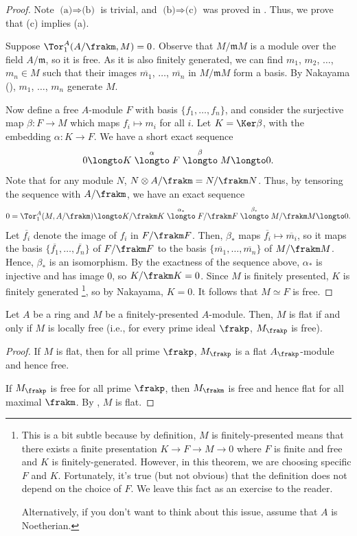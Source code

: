 \begin{proof}
    Note $\text{(a)}\Rightarrow\text{(b)}$ is trivial, and $\text{(b)}\Rightarrow\text{(c)}$ was proved in .
    Thus, we prove that (c) implies (a).

    Suppose $\Tor_1^A(A/\frakm, M)=0$. Observe that $M/\mathfrak mM$ is a module over the field $A/\mathfrak m$, so it is free. As it is also finitely generated, we can find $m_1$, $m_2$, $\dots$, $m_n\in M$ such that their images $\overline{m_1}$, $\dots$, $\overline{m_n}$ in $M/\mathfrak mM$ form a basis. By Nakayama (), 
    $m_1$, $\dots$, $m_n$ generate $M$.

    Now define a free $A$-module $F$ with basis $\{f_1, \dots, f_n\}$, and consider the surjective map $\beta: F\to M$ which maps $f_i\mapsto m_i$ for all $i$. Let $K=\Ker \beta$, with the embedding $\alpha:K\to F$. We have a short exact sequence \[0\longto K\stackrel\alpha\longto F\stackrel\beta\longto M\longto 0.\] Note that for any module $N$, $N\otimes A/\frakm = N/\frakm N$. Thus, by tensoring the sequence with $A/\frakm$, we have an exact sequence 
    \[0 = \Tor_1^A(M, A/\frakm) \longto K/\frakm K\stackrel{\alpha_*}\longto F/\frakm F\stackrel{\beta_*}\longto M/\frakm M\longto 0.\] 
    Let $\overline{f_i}$ denote the image of $f_i$ in $F/\frakm F$. Then, $\beta_*$ maps $\overline{f_i}\mapsto \overline{m_i}$, so it maps the basis $\{\overline{f_1},\dots, \overline{f_n}\}$ of $F/\frakm F$ to the basis $\{\overline{m_1},\dots, \overline{m_n}\}$ of $M/\frakm M$. Hence, $\beta_*$ is an isomorphism. By the exactness of the sequence above, $\alpha_*$ is injective and has image $0$, so $K/\frakm K=0$. Since $M$ is finitely presented, $K$ is finitely generated
    \footnote{This is a bit subtle because by definition,
    $M$ is finitely-presented means that there exists 
    a finite presentation $K\to F\to M\to 0$
    where $F$ is finite and free and $K$ is finitely-generated.
    However, in this theorem, we are choosing specific $F$
    and $K$. Fortunately, it's true (but not obvious)
    that the definition does not depend on the choice of $F$.
    We leave this fact as an exercise to the reader.
    
    Alternatively, if you don't want to think about this issue,
    assume that $A$ is Noetherian.}, 
    so by Nakayama, $K=0$. It follows that $M\simeq F$ is free.
\end{proof}
\begin{corollary}
    \label{cor:flat_locally_free}
    Let $A$ be a ring and $M$ be a finitely-presented $A$-module. Then, $M$ is flat if and only if $M$ is locally free (i.e., for every prime ideal $\frakp$, $M_\frakp$ is free).
\end{corollary}
\begin{proof}
    If $M$ is flat, then for all prime $\frakp$, $M_\frakp$ is a flat $A_\frakp$-module and hence free.

    If $M_\frakp$ is free for all prime $\frakp$, then $M_\frakm$ is free and hence flat for all maximal $\frakm$. By , $M$ is flat.
\end{proof}
